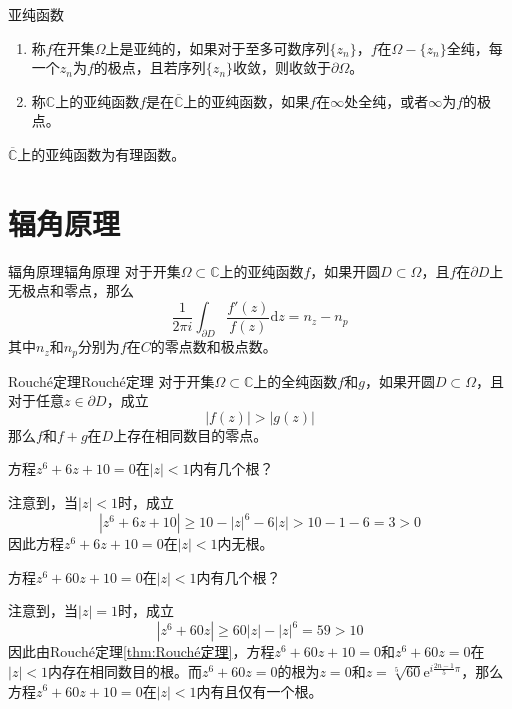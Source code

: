 \documentclass[lang = cn, scheme = chinese, thmcnt = section]{elegantbook}
\newcommand{\C}{\mathbb{C}}  		   %
\newcommand{\sub}{\subset}             %
\begin{document}
\begin{definition}{亚纯函数}
	\begin{enumerate}
		\item 称$f$在开集$\Omega$上是亚纯的，如果对于至多可数序列$\{z_n\}$，$f$在$\Omega-\{z_n\}$全纯，每一个$z_n$为$f$的极点，且若序列$\{z_n\}$收敛，则收敛于$\partial \Omega$。
		\item 称$\C$上的亚纯函数$f$是在$\overline{\C}$上的亚纯函数，如果$f$在$\infty$处全纯，或者$\infty$为$f$的极点。
	\end{enumerate}
\end{definition}

\begin{theorem}
	$\overline{\C}$上的亚纯函数为有理函数。
\end{theorem}

\section{辐角原理}

\begin{theorem}{辐角原理}{辐角原理}
	对于开集$\Omega\sub\C$上的亚纯函数$f$，如果开圆$D\sub\Omega$，且$f$在$\partial D$上无极点和零点，那么
	$$
	\frac{1}{2\pi i}\int_{\partial D}{\frac{f'(z)}{f(z)}\mathrm{d}z}=n_{z}-n_{p}
	$$
	其中$n_z$和$n_p$分别为$f$在$C$的零点数和极点数。
\end{theorem}

\begin{theorem}{Rouché定理}{Rouché定理}
	对于开集$\Omega\sub\C$上的全纯函数$f$和$g$，如果开圆$D\sub\Omega$，且对于任意$z\in\partial D$，成立
	$$
	|f(z)|>|g(z)|
	$$
	那么$f$和$f+g$在$D$上存在相同数目的零点。
\end{theorem}

\begin{example}
	方程$z^6+6z+10=0$在$|z|<1$内有几个根？
\end{example}

\begin{solution}
	注意到，当$|z|<1$时，成立
	$$
	|z^6+6z+10|\ge10-|z|^6-6|z|>10-1-6=3>0
	$$
	因此方程$z^6+6z+10=0$在$|z|<1$内无根。
\end{solution}

\begin{example}
	方程$z^6+60z+10=0$在$|z|<1$内有几个根？
\end{example}

\begin{solution}
	注意到，当$|z|=1$时，成立
	$$
	|z^6+60z|\ge60|z|-|z|^6=59>10
	$$
	因此由Rouché定理\ref{thm:Rouché定理}，方程$z^6+60z+10=0$和$z^6+60z=0$在$|z|<1$内存在相同数目的根。而$z^6+60z=0$的根为$z=0$和$z=\sqrt[5]{60}\mathrm{e}^{i\frac{2n-1}{5}\pi}$，那么方程$z^6+60z+10=0$在$|z|<1$内有且仅有一个根。
\end{solution}
\end{document}
